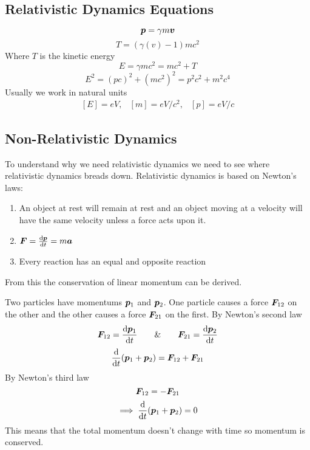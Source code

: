 \documentclass{article}
\begin{document}
    \subsection{Relativistic Dynamics Equations}
    \[\bm{p} = \gamma m\bm{v}\]
    \[T = (\gamma(v) - 1)mc^2\]
    Where \(T\) is the kinetic energy
    \[E = \gamma mc^2 = mc^2 + T\]
    \[E^2 = (pc)^2 + (mc^2)^2 = p^2c^2 + m^2c^4\]
    Usually we work in natural units
    \[
        \begin{array}{ccc}
            [E] = \si{eV}, & [m] = \si{eV/c^2}, & [p] = eV/c
        \end{array}
    \]
    
    \subsection{Non-Relativistic Dynamics}
    To understand why we need relativistic dynamics we need to see where relativistic dynamics breads down.
    Relativistic dynamics is based on Newton's laws:
    \begin{enumerate}
        \item An object at rest will remain at rest and an object moving at a velocity will have the same velocity unless a force acts upon it.
        \item \(\bm{F} = \dv{\bm{p}}{t} = m\bm{a}\)
        \item Every reaction has an equal and opposite reaction
    \end{enumerate}
    From this the conservation of linear momentum can be derived.
    
    Two particles have momentums \(\bm{p}_1\) and \(\bm{p}_2\). 
    One particle causes a force \(\bm{F}_{12}\) on the other and the other causes a force \(\bm{F}_{21}\) on the first.
    By Newton's second law
    \[\bm{F}_{12} = \dv{\bm{p}_1}{t}\qquad \& \qquad \bm{F}_{21} = \dv{\bm{p}_2}{t}\]
    \[\dv{t}(\bm{p}_1 + \bm{p}_2) = \bm{F}_{12} + \bm{F}_{21}\]
    By Newton's third law
    \[\bm{F}_{12} = -\bm{F}_{21}\]
    \[\implies \dv{t}(\bm{p}_1 + \bm{p}_2) = 0\]
    This means that the total momentum doesn't change with time so momentum is conserved.
    
\end{document}
